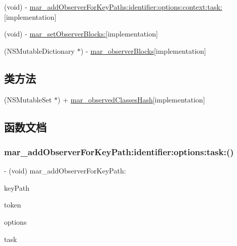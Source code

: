 \begin{DoxyCompactItemize}
\item 
(void) -\/ \hyperlink{category_n_s_object_07_m_a_r___observer_08_a5291491c0cc3e6242e336641ec834dff}{mar\+\_\+add\+Observer\+For\+Key\+Paths\+:identifier\+:options\+:context\+:task\+:}{\ttfamily  \mbox{[}implementation\mbox{]}}
\item 
(void) -\/ \hyperlink{category_n_s_object_07_m_a_r___observer_08_a16dc347007ed42bb5d1287e0bc3f0094}{mar\+\_\+set\+Observer\+Blocks\+:}{\ttfamily  \mbox{[}implementation\mbox{]}}
\item 
(N\+S\+Mutable\+Dictionary $\ast$) -\/ \hyperlink{category_n_s_object_07_m_a_r___observer_08_a6bfd64fca20cc2600f362881068ceea4}{mar\+\_\+observer\+Blocks}{\ttfamily  \mbox{[}implementation\mbox{]}}
\end{DoxyCompactItemize}
\subsection*{类方法}
\begin{DoxyCompactItemize}
\item 
(N\+S\+Mutable\+Set $\ast$) + \hyperlink{category_n_s_object_07_m_a_r___observer_08_a2e0945c8f622db5c54bc2a20c8678726}{mar\+\_\+observed\+Classes\+Hash}{\ttfamily  \mbox{[}implementation\mbox{]}}
\end{DoxyCompactItemize}


\subsection{函数文档}
\mbox{\label{category_n_s_object_07_m_a_r___observer_08_aa0a9f6f044fa257f693ae1def9a9ed77}} 
\subsubsection{\texorpdfstring{mar\+\_\+add\+Observer\+For\+Key\+Path\+:identifier\+:options\+:task\+:()}{mar\_addObserverForKeyPath:identifier:options:task:()}}
{\footnotesize\ttfamily -\/ (void) mar\+\_\+add\+Observer\+For\+Key\+Path\+: \begin{DoxyParamCaption}\item[{(N\+S\+String $\ast$)}]{key\+Path }\item[{identifier:(N\+S\+String $\ast$)}]{token }\item[{options:(N\+S\+Key\+Value\+Observing\+Options)}]{options }\item[{task:(void($^\wedge$)(id obj, N\+S\+Dictionary $\ast$change))}]{task }\end{DoxyParamCaption}}

